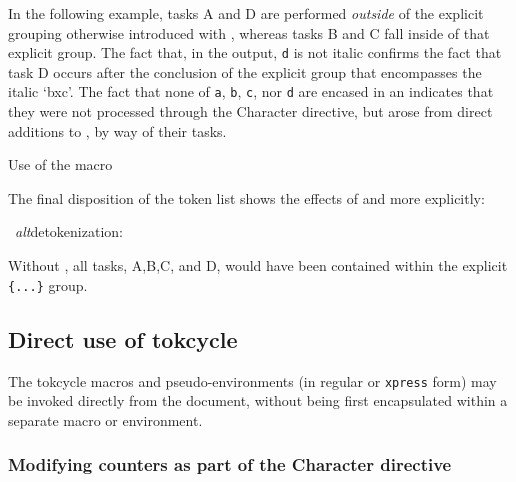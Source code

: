 \documentclass[10pt]{article}
\def\altdecytoks{\par\medskip\begingroup\noindent\macname{cytoks}
  \ \textit{alt}detokenization:\\\raggedright\footnotesize\ttfamily
  \expandafter\altdetokenize\expandafter{\the\cytoks}\normalsize\par
  \endgroup\medskip}
\newcommand\TokCycle{\textsf{tokcycle}}
\begin{document}
\medskip In the following example, tasks A and D are performed \textit{outside}
  of the explicit grouping otherwise introduced with ,
  whereas tasks B and C fall inside of that explicit group.
The fact that, in the output, \texttt{d} is not italic confirms the 
  fact that task D occurs after the conclusion of the explicit  
  group that encompasses the italic `bxc'.
The fact that none of \texttt{a}, \texttt{b}, \texttt{c}, nor \texttt{d} are
  encased in an  indicates that they were not processed through
  the Character directive, but arose from direct additions to ,
  by way of their tasks.

\begin{exampleA}[lefthand width=10cm]{Use of the 
  macro}
\stripgroupingtrue
{}
\def\taskA{\addcytoks{\bgroup\LARGE a}}
\def\taskB{\addcytoks{\itshape b}}
\def\taskC{\addcytoks{c}}
\def\taskD{\addcytoks{d\egroup}}

\the\cytoks
\end{exampleA}

The final disposition of the  token list shows the effects of
   and  more explicitly:

\altdecytoks

Without , all tasks, A,B,C, and D, would have
  been contained within the explicit \texttt{\{...\}} group.

\endgroup



\subsection{Direct use of \TokCycle}

The \TokCycle{} macros and pseudo-environments
  (in regular or \texttt{xpress} form) may be invoked 
  directly from the document, without
  being first encapsulated within a separate macro or environment.

\subsubsection{Modifying counters as part of the Character
  directive}

\begingroup
\end{document}
